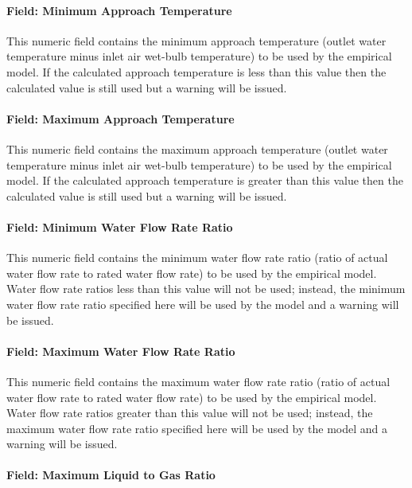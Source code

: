 \paragraph{Field: Minimum Approach Temperature}\label{field-minimum-approach-temperature-1}

This numeric field contains the minimum approach temperature (outlet water temperature minus inlet air wet-bulb temperature) to be used by the empirical model. If the calculated approach temperature is less than this value then the calculated value is still used but a warning will be issued.

\paragraph{Field: Maximum Approach Temperature}\label{field-maximum-approach-temperature-1}

This numeric field contains the maximum approach temperature (outlet water temperature minus inlet air wet-bulb temperature) to be used by the empirical model. If the calculated approach temperature is greater than this value then the calculated value is still used but a warning will be issued.

\paragraph{Field: Minimum Water Flow Rate Ratio}\label{field-minimum-water-flow-rate-ratio-1}

This numeric field contains the minimum water flow rate ratio (ratio of actual water flow rate to rated water flow rate) to be used by the empirical model. Water flow rate ratios less than this value will not be used; instead, the minimum water flow rate ratio specified here will be used by the model and a warning will be issued.

\paragraph{Field: Maximum Water Flow Rate Ratio}\label{field-maximum-water-flow-rate-ratio-1}

This numeric field contains the maximum water flow rate ratio (ratio of actual water flow rate to rated water flow rate) to be used by the empirical model. Water flow rate ratios greater than this value will not be used; instead, the maximum water flow rate ratio specified here will be used by the model and a warning will be issued.

\paragraph{Field: Maximum Liquid to Gas Ratio}\label{field-maximum-liquid-to-gas-ratio}

